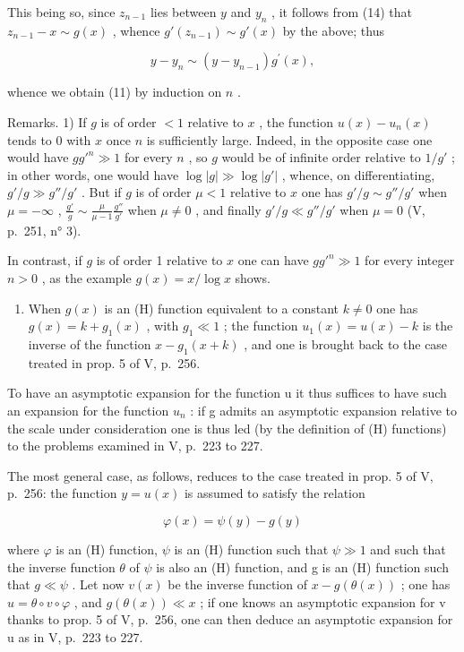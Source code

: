 This being so, since \(z_{n-1}\) lies between \(y\) and \(y_n\) , it follows from (14) that \(z_{n-1} - x \sim g(x)\) , whence \(g'(z_{n-1}) \sim g'(x)\) by the above; thus

\[
y - y _ {n} \sim (y - y _ {n - 1}) g ^ {\prime} (x),
\]

whence we obtain (11) by induction on \(n\) .

Remarks. 1) If \(g\) is of order \(< 1\) relative to \(x\) , the function \(u(x) - u_n(x)\) tends to 0 with \(x\) once \(n\) is sufficiently large. Indeed, in the opposite case one would have \(gg'^n \gg 1\) for every \(n\) , so \(g\) would be of infinite order relative to \(1 / g'\) ; in other words, one would have \(\log |g| \gg \log |g'|\) , whence, on differentiating, \(g'/g \gg g''/g'\) . But if \(g\) is of order \(\mu < 1\) relative to \(x\) one has \(g'/g \sim g''/g'\) when \(\mu = -\infty\) , \(\frac{g'}{g} \sim \frac{\mu}{\mu - 1} \frac{g''}{g'}\) when \(\mu \neq 0\) , and finally \(g'/g \ll g''/g'\) when \(\mu = 0\) (V, p.~251, n° 3).

In contrast, if \(g\) is of order 1 relative to \(x\) one can have \(gg'^n \gg 1\) for every integer \(n > 0\) , as the example \(g(x) = x / \log x\) shows.

\begin{enumerate}
\def\labelenumi{\arabic{enumi})}
\setcounter{enumi}{1}
\tightlist
\item
  When \(g(x)\) is an (H) function equivalent to a constant \(k \neq 0\) one has \(g(x) = k + g_1(x)\) , with \(g_1 \ll 1\) ; the function \(u_1(x) = u(x) - k\) is the inverse of the function \(x - g_1(x + k)\) , and one is brought back to the case treated in prop. 5 of V, p.~256.
\end{enumerate}

To have an asymptotic expansion for the function u it thus suffices to have such an expansion for the function \(u_{n}\) : if g admits an asymptotic expansion relative to the scale under consideration one is thus led (by the definition of (H) functions) to the problems examined in V, p.~223 to 227.

The most general case, as follows, reduces to the case treated in prop. 5 of V, p.~256: the function \(y = u(x)\) is assumed to satisfy the relation

\[
\varphi (x) = \psi (y) - g (y)\tag{15}
\]

where \(\varphi\) is an (H) function, \(\psi\) is an (H) function such that \(\psi \gg 1\) and such that the inverse function \(\theta\) of \(\psi\) is also an (H) function, and g is an (H) function such that \(g \ll \psi\) . Let now \(v(x)\) be the inverse function of \(x - g(\theta(x))\) ; one has \(u = \theta \circ v \circ \varphi\) , and \(g(\theta(x)) \ll x\) ; if one knows an asymptotic expansion for v thanks to prop. 5 of V, p.~256, one can then deduce an asymptotic expansion for u as in V, p.~223 to 227.

